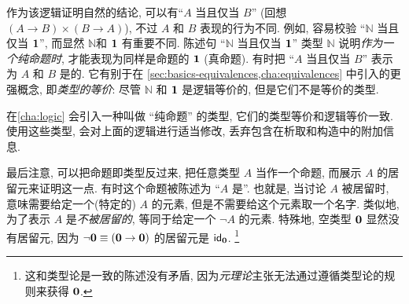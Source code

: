 作为该逻辑证明自然的结论, 可以有``$A$ 当且仅当 $B$'' (回想 $(A\to B)\times (B\to A)$), 不过 $A$ 和 $B$ 表现的行为不同.
例如, 容易校验 ``$\mathbb{N}$ 当且仅当 $\unit$'', 而显然 $\mathbb{N}$和 $\unit$ 有重要不同.
陈述句 ``$\mathbb{N}$ 当且仅当 $\unit$'' 类型 $\mathbb{N}$ 说明\emph{作为一个纯命题时}, 才能表现为同样是命题的 $\unit$ (真命题).
有时把 ``$A$ 当且仅当 $B$'' 表示为 $A$ 和 $B$ 是的.
%
%
它有别于在 \cref{sec:basics-equivalences,cha:equivalences} 中引入的更强概念, 即\emph{类型的等价}: 尽管 $\mathbb{N}$ 和 $\unit$ 是逻辑等价的, 但是它们不是等价的类型.

在\cref{cha:logic} 会引入一种叫做 ``纯命题'' 的类型, 它们的类型等价和逻辑等价一致.
使用这些类型, 会对上面的逻辑进行适当修改,  丢弃包含在析取和构造中的附加信息.

最后注意, 可以把命题即类型反过来, 把任意类型 $A$ 当作一个命题, 而展示 $A$ 的居留元来证明这一点.
有时这个命题被陈述为 ``$A$ 是''.
%
%
也就是, 当讨论 $A$ 被居留时, 意味需要给定一个(特定的) $A$ 的元素, 但是不需要给这个元素取一个名字.
类似地, 为了表示 $A$ 是\emph{不被居留的}, 等同于给定一个 $\neg A$ 的元素.
特殊地, 空类型 $\emptyt$ 显然没有居留元, 因为 $\neg \emptyt \jdeq (\emptyt \to \emptyt)$ 的居留元是 $\idfunc[\emptyt]$.
\footnote{这和类型论是一致的陈述没有矛盾, 因为\emph{元理论}主张无法通过遵循类型论的规则来获得 $\emptyt$.}

%
%
%